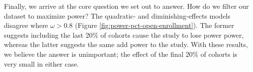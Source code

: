 Finally, we arrive at the core question we set out to answer. How do we filter our dataset to maximize power? The quadratic- and diminishing-effects models disagree where $\omega > 0.8$ (Figure \ref{fig:power-pct-open-enrollment}). The former suggests including the last 20\% of cohorts cause the study to lose power power, whereas the latter suggests the same add power to the study. With these results, we believe the answer is unimportant; the effect of the final 20\% of cohorts is very small in either case\footnotemark.



